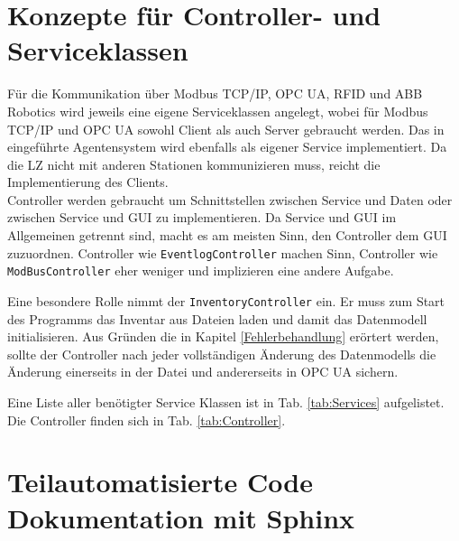 \section{Konzepte für Controller- und Serviceklassen}\label{ControllerServices}

Für die Kommunikation über Modbus TCP/IP, OPC UA, RFID und ABB Robotics wird jeweils eine eigene Serviceklassen angelegt,
wobei für Modbus TCP/IP  und OPC UA sowohl Client als auch Server gebraucht werden.
Das in \cite{LarsKistner2017} eingeführte Agentensystem wird ebenfalls als eigener Service implementiert.
Da die LZ nicht mit anderen Stationen kommunizieren muss, reicht die Implementierung des Clients.\\

Controller werden gebraucht um Schnittstellen zwischen Service und Daten oder zwischen Service und GUI zu implementieren.
Da Service und GUI im Allgemeinen getrennt sind, macht es am meisten Sinn, den Controller dem GUI zuzuordnen.
Controller wie \verb|EventlogController| machen Sinn, Controller wie \verb|ModBusController| eher weniger und implizieren
eine andere Aufgabe.

Eine besondere Rolle nimmt der \verb|InventoryController| ein.
Er muss zum Start des Programms das Inventar aus Dateien laden und damit das Datenmodell initialisieren.
Aus Gründen die in Kapitel \ref{Fehlerbehandlung} erörtert werden, sollte der Controller nach jeder vollständigen Änderung
des Datenmodells die Änderung einerseits in der Datei und andererseits in OPC UA sichern.

Eine Liste aller benötigter Service Klassen ist in Tab. \ref{tab:Services} aufgelistet.
Die Controller finden sich in Tab. \ref{tab:Controller}.





\newpage
\section{Teilautomatisierte Code Dokumentation mit Sphinx}

